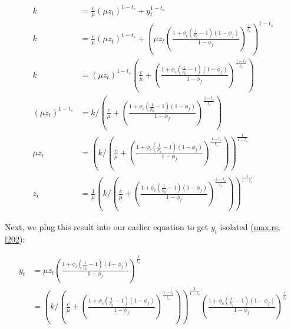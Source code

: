 \begin{equation}
\begin{aligned}
k &= \tfrac{c}{\mu} (\mu z_{t})^{1 - t_{s}} + y_{t}^{1 - t_{s}} \\
k &= \tfrac{c}{\mu} (\mu z_{t})^{1-t_{s}} + \left( \mu z_{t} \left( \tfrac{1 + \phi_{c} (\tfrac{1}{p_{0}}-1) (1 - \phi_{f})}{1 - \phi_{f}} \right)^{\tfrac{1}{t_{s}}} \right)^{1-t_{s}} \\
k &= \left( \mu z_{t} \right)^{1 - t_{s}} \left( \tfrac{c}{\mu} + \left( \tfrac{1 + \phi_{c}\left( \tfrac{1}{p_{0}} - 1 \right) \left( 1 - \phi_{f} \right)}{1 - \phi_{f}} \right)^{\tfrac{1-t_{s}}{t_{s}}} \right) \\
\left( \mu z_{t} \right)^{1-t_{s}} &= k \bigg/ \left( \tfrac{c}{\mu} + \left( \tfrac{1 + \phi_{c}\left( \tfrac{1}{p_{0}} - 1 \right) \left( 1 - \phi_{f} \right)}{1 - \phi_{f}} \right)^{\tfrac{1-t_{s}}{t_{s}}} \right) \\
\mu z_{t} &= \left( k \bigg/ \left( \tfrac{c}{\mu} + \left( \tfrac{1 + \phi_{c}\left( \tfrac{1}{p_{0}} - 1 \right) \left( 1 - \phi_{f} \right)}{1 - \phi_{f}} \right)^{\tfrac{1-t_{s}}{t_{s}}} \right) \right)^{\tfrac{1}{1-t_{s}}} \\
z_{t} &= \tfrac{1}{\mu} \left( k \bigg/ \left( \tfrac{c}{\mu} + \left( \tfrac{1 + \phi_{c} \left( \tfrac{1}{p_{0}} - 1 \right) \left( 1 - \phi_{f} \right)}{1 - \phi_{f}} \right)^{\tfrac{1-t_{s}}{t_{s}}} \right) \right)^{\tfrac{1}{1 - t_{s}}}
\end{aligned}
\end{equation}

Next, we plug this result into our earlier equation to get $y_{t}$ isolated (\href{https://github.com/delvtech/hyperdrive/blob/570263e2b85c411b4097132bfe7ad2a085e3180b/crates/hyperdrive-math/src/long/max.rs#L202}{max.rs, l202}):

\begin{equation}\label{yt-price}
\begin{aligned}
y_{t} &= \mu z_{t} \left( \tfrac{1 + \phi_{c} (\tfrac{1}{p_{0}} - 1) (1 - \phi_{f})}{1 - \phi_{f}} \right)^{\tfrac{1}{t_{s}}} \\
&= \left( k \bigg/ \left( \tfrac{c}{\mu} + \left( \tfrac{1 + \phi_{c} \left( \tfrac{1}{p_{0}} - 1 \right) \left( 1 - \phi_{f} \right)}{1 - \phi_{f}} \right)^{\tfrac{1-t_{s}}{t_{s}}} \right) \right)^{\tfrac{1}{1 - t_{s}}} \left( \tfrac{1 + \phi_{c} \left( \tfrac{1}{p_{0}} - 1 \right) \left( 1 - \phi_{f} \right)}{1 - \phi_{f}} \right)^{\tfrac{1}{t_{s}}} \\
\end{aligned}
\end{equation}


